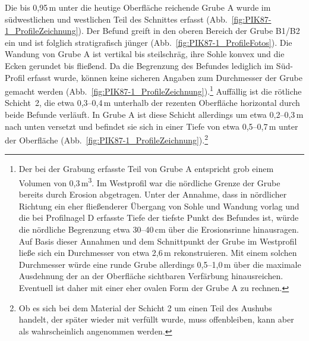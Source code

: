 Die bis 0,95\,m unter die heutige Oberfläche reichende Grube A wurde im südwestlichen und westlichen Teil des Schnittes erfasst (Abb.~\ref{fig:PIK87-1_ProfileZeichnung}). Der Befund greift in den oberen Bereich der Grube B1/B2 ein und ist folglich stratigrafisch jünger (Abb.~\ref{fig:PIK87-1_ProfileFotos}). Die Wandung von Grube A ist vertikal bis steilschräg, ihre Sohle konvex und die Ecken gerundet bis fließend. Da die Begrenzung des Befundes lediglich im Süd-Profil erfasst wurde, können keine sicheren Angaben zum Durchmesser der Grube gemacht werden (Abb.~\ref{fig:PIK87-1_ProfileZeichnung}).\footnote{Der bei der Grabung erfasste Teil von Grube A entspricht grob einem Volumen von 0,3\,m\textsuperscript{3}. Im Westprofil war die nördliche Grenze der Grube bereits durch Erosion abgetragen. Unter der Annahme, dass in nördlicher Richtung ein eher fließenderer Übergang von Sohle und Wandung vorlag und die bei Profilnagel D erfasste Tiefe der tiefste Punkt des Befundes ist, würde die nördliche Begrenzung etwa 30--40\,cm über die Erosionsrinne hinausragen. Auf Basis dieser Annahmen und dem Schnittpunkt der Grube im Westprofil ließe sich ein Durchmesser von etwa 2,6\,m rekonstruieren. Mit einem solchen Durchmesser würde eine runde Grube allerdings 0,5--1,0\,m über die maximale Ausdehnung der an der Oberfläche sichtbaren Verfärbung hinausreichen. Eventuell ist daher mit einer eher ovalen Form der Grube A zu rechnen.} Auffällig ist die rötliche Schicht~2, die etwa 0,3--0,4\,m unterhalb der rezenten Oberfläche horizontal durch beide Befunde verläuft. In Grube A ist diese Schicht allerdings um etwa 0,2--0,3\,m nach unten versetzt und befindet sie sich in einer Tiefe von etwa 0,5--0,7\,m unter der Oberfläche (Abb.~\ref{fig:PIK87-1_ProfileZeichnung}).\footnote{Ob es sich bei dem Material der Schicht 2 um einen Teil des Aushubs handelt, der später wieder mit verfüllt wurde, muss offenbleiben, kann aber als wahrscheinlich angenommen werden.}

